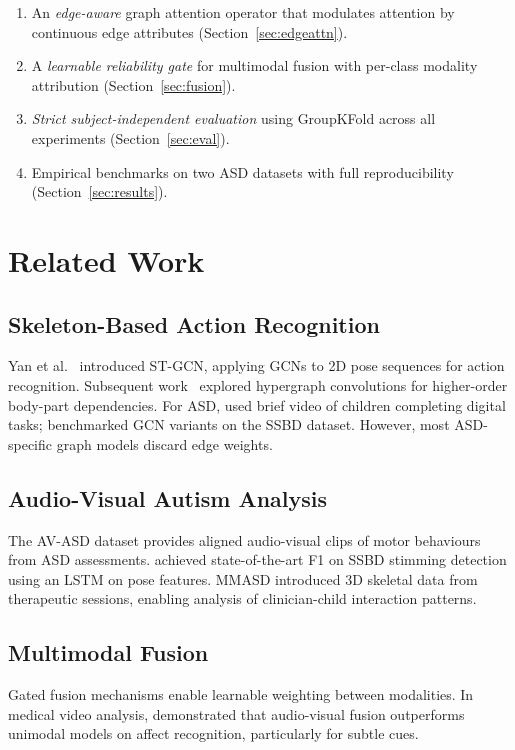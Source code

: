 \documentclass[conference]{IEEEtran}
\begin{document}
\begin{enumerate}
  \item An \textit{edge-aware} graph attention operator that modulates attention by 
        continuous edge attributes (Section~\ref{sec:edgeattn}).
  \item A \textit{learnable reliability gate} for multimodal fusion with per-class 
        modality attribution (Section~\ref{sec:fusion}).
  \item \textit{Strict subject-independent evaluation} using GroupKFold across all 
        experiments (Section~\ref{sec:eval}).
  \item Empirical benchmarks on two ASD datasets with full reproducibility 
        (Section~\ref{sec:results}).
\end{enumerate}

\section{Related Work}

\subsection{Skeleton-Based Action Recognition}
Yan et al.\ \cite{Yan2018} introduced ST-GCN, applying GCNs to 2D pose sequences for 
action recognition. Subsequent work~\cite{Liu2020} explored hypergraph convolutions for 
higher-order body-part dependencies. For ASD, \cite{Sapiro2019} used brief video of 
children completing digital tasks; \cite{Zhao2023} benchmarked GCN variants on the 
SSBD dataset. However, most ASD-specific graph models discard edge weights.

\subsection{Audio-Visual Autism Analysis}
The AV-ASD dataset \cite{Wan2023} provides aligned audio-visual clips of motor 
behaviours from ASD assessments. \cite{Tariq2018} achieved state-of-the-art F1 on SSBD 
stimming detection using an LSTM on pose features. MMASD \cite{Krishnaswamy2022} 
introduced 3D skeletal data from therapeutic sessions, enabling analysis of 
clinician-child interaction patterns.

\subsection{Multimodal Fusion}
Gated fusion mechanisms \cite{Arevalo2017} enable learnable weighting between modalities. 
In medical video analysis, \cite{Liang2021} demonstrated that audio-visual fusion 
outperforms unimodal models on affect recognition, particularly for subtle cues.
\end{document}
